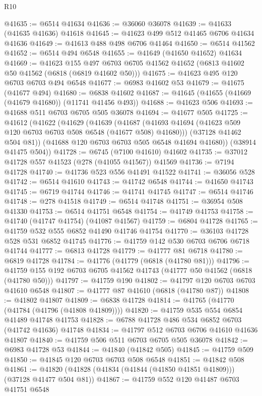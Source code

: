 \begin{lexlean}{R10}
\begin{coremodule}
@41635 := @6514 @41634
@41636 := @36060 @36078
@41639 := @41633 (@41635 @41636) @41618
@41645 := @41623 @499 @512 @41465 @6706 @41634 @41636
@41649 := @41613 @488 @498 @6706 @41464
@41650 := @6514 @41562
@41652 := @6514 @494 @6548
@41655 := @41649 (@41650 @41652) @41634
@41669 := @41623
    @155
    @497
    @6703
    @6705
    @41562
    @41652
    (@6813 @41602 @50 @41562 (@6818 (@6819 @41602 @50)))
@41675 := @41623 @495 @120 @6703 @6703 @494 @6548
@41677 := @6983 @41602 @53
@41679 := @41675 (@41677 @494)
@41680 := @6838 @41602
@41687 := @41645 (@41655 (@41669 (@41679 @41680)) (@11741 @41456 @493))
@41688 := @41623 @506
@41693 := @41688 @511 @6703 @6705 @505 @36078
@41694 := @41677 @505
@41725 := @41612
    (@41622
      (@41629
        (@41639
          (@41687 (@41693 @41694 (@41623 @509 @120 @6703 @6703 @508 @6548 (@41677 @508) @41680)))
          (@37128 @41462 @504 @81))
        (@41688 @120 @6703 @6703 @505 @6548 @41694 @41680))
      (@38914 @41475 @504))
@41728 := @6745 (@7100 @41610) @41602
@41735 := @37012 @41728 @557 @41523 (@278 (@41055 @41567)) @41569
@41736 := @7194 @41728
@41740 := @41736 @523 @556 @41491 @41522
@41741 := @36056 @528
@41742 := @6514 @41610
@41743 := @41742 @6548
@41744 := @41650 @41743
@41745 := @6719 @41744
@41746 := @41741 @41745
@41747 := @6514 @41746
@41748 := @278 @41518
@41749 := @6514 @41748
@41751 := @36954 @508 @41330
@41753 := @6514 @41751 @6548
@41754 := @41749 @41753
@41758 := @41740 (@41747 @41754) (@41087 @41567)
@41759 := @6804 @41728
@41765 := @41759 @532 @555 @6852 @41490 @41746 @41754
@41770 := @36103 @41728 @528 @531 @6852 @41745
@41776 := @41759 @142 @530 @6703 @6706 @6718 @41744
@41777 := @6813 @41728
@41779 := @41777 @81 @6718
@41780 := @6819 @41728
@41784 := @41776 (@41779 (@6818 (@41780 @81)))
@41796 := @41759 @155 @192 @6703 @6705 @41562 @41743 (@41777 @50 @41562 (@6818 (@41780 @50)))
@41797 := @41759 @190
@41802 := @41797 @120 @6703 @6703 @41610 @6548
@41807 := @41777 @87 @41610 (@6818 (@41780 @87))
@41808 := @41802 @41807
@41809 := @6838 @41728
@41814 := @41765 (@41770 (@41784 (@41796 (@41808 @41809))))
@41820 := @41759 @535 @554 @6854 @41489 @41748 @41753
@41828 := @6788 @41728 @486 @534 @6852 @6703 (@41742 @41636) @41748
@41834 := @41797 @512 @6703 @6706 @41610 @41636 @41807
@41840 := @41759 @506 @511 @6703 @6705 @505 @36078
@41842 := @6983 @41728 @53
@41844 := @41840 (@41842 @505)
@41845 := @41759 @509
@41850 := @41845 @120 @6703 @6703 @508 @6548
@41851 := @41842 @508
@41861 := @41820 (@41828 (@41834 (@41844 (@41850 @41851 @41809))) (@37128 @41477 @504 @81))
@41867 := @41759 @552 @120 @41487 @6703 @41751 @6548

\end{coremodule}
\end{lexlean}
